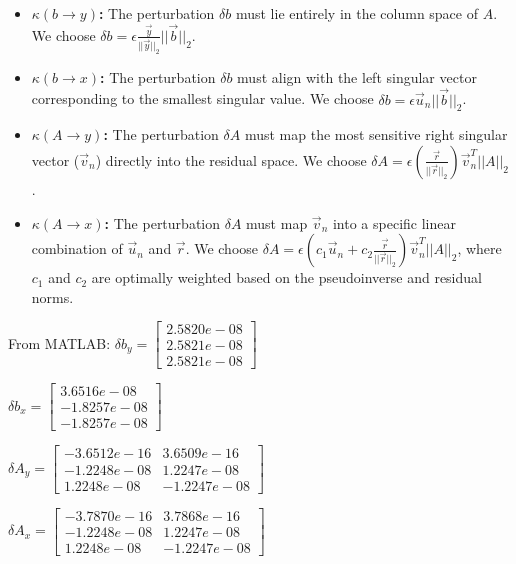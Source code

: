 \documentclass[11pt]{article}
\begin{document}
\begin{itemize}
    \item \textbf{$\kappa(b \rightarrow y)$:} The perturbation $\delta b$ must lie entirely in the column space of $A$. We choose $\delta b = \epsilon \frac{\vec{y}}{||\vec{y}||_2} ||\vec{b}||_2$.
    
    \item \textbf{$\kappa(b \rightarrow x)$:} The perturbation $\delta b$ must align with the left singular vector corresponding to the smallest singular value. We choose $\delta b = \epsilon \vec{u}_n ||\vec{b}||_2$.
    
    \item \textbf{$\kappa(A \rightarrow y)$:} The perturbation $\delta A$ must map the most sensitive right singular vector ($\vec{v}_n$) directly into the residual space. We choose $\delta A = \epsilon \left(\frac{\vec{r}}{||\vec{r}||_2}\right) \vec{v}_n^T ||A||_2$.
    
    \item \textbf{$\kappa(A \rightarrow x)$:} The perturbation $\delta A$ must map $\vec{v}_n$ into a specific linear combination of $\vec{u}_n$ and $\vec{r}$. We choose $\delta A = \epsilon \left(c_1 \vec{u}_n + c_2 \frac{\vec{r}}{||\vec{r}||_2}\right) \vec{v}_n^T ||A||_2$, where $c_1$ and $c_2$ are optimally weighted based on the pseudoinverse and residual norms.
\end{itemize}

From MATLAB:
$\delta b_y = \begin{bmatrix} 2.5820e-08 \\ 2.5821e-08 \\ 2.5821e-08 \end{bmatrix}$

$\delta b_x = \begin{bmatrix} 3.6516e-08 \\ -1.8257e-08 \\ -1.8257e-08 \end{bmatrix}$

$\delta A_y = \begin{bmatrix} -3.6512e-16 & 3.6509e-16 \\ -1.2248e-08 & 1.2247e-08 \\ 1.2248e-08 & -1.2247e-08 \end{bmatrix}$

$\delta A_x = \begin{bmatrix} -3.7870e-16 & 3.7868e-16 \\ -1.2248e-08 & 1.2247e-08 \\ 1.2248e-08 & -1.2247e-08 \end{bmatrix}$
\end{document}
